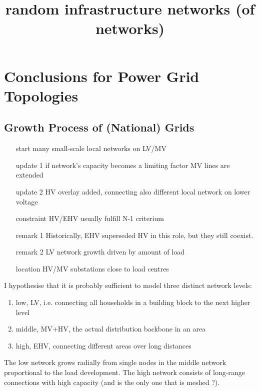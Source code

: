 \documentclass[paper=a4, fontsize=12pt]{article}
\title{random infrastructure networks (of networks)}
\begin{document}
\maketitle

\tableofcontents

\section{Conclusions for Power Grid Topologies}

\subsection*{Growth Process of (National) Grids}

\begin{itemize}
\item[start] many small-scale local networks on LV/MV \cite{50Hertz, BURN}
\item[update 1] if network's capacity becomes a limiting factor MV lines are extended
\item[update 2] HV overlay added, connecting also different local network on lower voltage \cite[p.3]{Lakervi1995}
\item[constraint] HV/EHV usually fulfill N-1 criterium \cite[p.7]{Lakervi1995}
\item[remark 1] Historically, EHV superseded HV in this role, but they still coexist. \cite[p.148]{Lakervi1995}
\item[remark 2] LV network growth driven by amount of load
\item[location] HV/MV substations close to load centres \cite[p.152]{Lakervi1995}
\end{itemize}

I hypothesise that it is probably sufficient to model three distinct network levels:
\begin{enumerate}
\item low,  LV, i.e. connecting all households in a building block to the next higher level
\item middle,  MV+HV, the actual distribution backbone in an area
\item high,  EHV, connecting different areas over long distances
\end{enumerate}

The low network grows radially from single nodes in the middle network proportional to the load development.
The high network consists of long-range connections with high capacity (and is the only one that is meshed ?).
\end{document}
